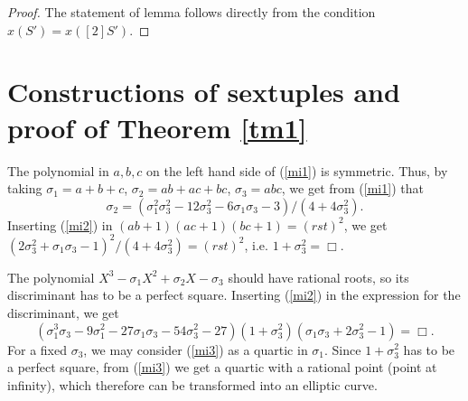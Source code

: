 \documentclass[11pt]{amsart}
\theoremstyle{plain}
\theoremstyle{remark}
\begin{document}
\begin{proof}
The statement of lemma follows directly from the condition $x(S')=x([2]S')$.
\end{proof}


\section{Constructions of sextuples and proof of Theorem \ref{tm1}} \label{sec3}

\noindent The polynomial in $a,b,c$ on the left hand side of (\ref{mi1}) is symmetric. Thus, by taking $\sigma_1=a+b+c$, $\sigma_2=ab+ac+bc$, $\sigma_3=abc$, we get from (\ref{mi1}) that
\begin{equation}
\label{mi2}
\sigma_2=(\sigma_1^2 \sigma_3^2-12\sigma_3^2-6\sigma_1 \sigma_3-3)/(4+4\sigma_3^2).
\end{equation}
Inserting (\ref{mi2}) in $(ab+1)(ac+1)(bc+1)=(rst)^2$, we get $(2\sigma_3^2+\sigma_1\sigma_3-1)^2/(4+4\sigma_3^2)=(rst)^2$, i.e. $1+\sigma_3^2=\Box$.

The polynomial $X^3-\sigma_1X^2+\sigma_2X-\sigma_3$ should have rational roots, so its discriminant has to be a perfect square.
Inserting (\ref{mi2}) in the expression for the discriminant, we get
\begin{equation}
\label{mi3}
(\sigma_1^3 \sigma_3-9 \sigma_1^2-27\sigma_1 \sigma_3-54\sigma_3^2-27)(1+\sigma_3^2)(\sigma_1 \sigma_3+2\sigma_3^2-1) = \Box.
\end{equation}
For a fixed $\sigma_3$, we may consider (\ref{mi3}) as a quartic in $\sigma_1$. Since $1+\sigma_3^2$ has to be a perfect square, from (\ref{mi3}) we get a quartic with a rational point (point at infinity), which therefore can be transformed into an elliptic curve.
\end{document}
